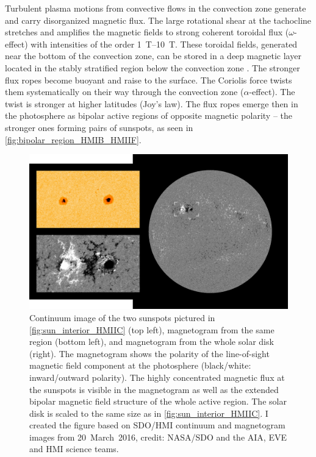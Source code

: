 Turbulent plasma motions from convective flows in the convection zone generate and carry disorganized magnetic flux. The large rotational shear at the tachocline stretches and amplifies the magnetic fields to strong coherent toroidal flux ($\omega$-effect) with intensities of the order \SIrange{1}{10}{\tesla}. These toroidal fields, generated near the bottom of the convection zone, can be stored in a deep magnetic layer located in the stably stratified region below the convection zone \citep{Ossendrijver2003}. The stronger flux ropes become buoyant and raise to the surface. The Coriolis force twists them systematically on their way through the convection zone ($\alpha$-effect). The twist is stronger at higher latitudes (Joy's law). The flux ropes emerge then in the photosphere as bipolar active regions of opposite magnetic polarity -- the stronger ones forming pairs of sunspots, as seen in \autoref{fig:bipolar_region_HMIB_HMIIF}.
\begin{figure}[htb]
	\centering
	\includegraphics[width=\textwidth]{figures_of_mine/schemata/bipolar_region_HMIB_HMIIF.png}
	\caption[I created the figure based on SDO/HMI continuum and magnetogram images from 20~March~2016, credit: NASA/SDO and the AIA, EVE and HMI science teams.]
	{Continuum image of the two sunspots pictured in \autoref{fig:sun_interior_HMIIC} (top left), magnetogram from the same region (bottom left), and magnetogram from the whole solar disk (right). The magnetogram shows the polarity of the line-of-sight magnetic field component at the photosphere (black/white: inward/outward polarity). The highly concentrated magnetic flux at the sunspots is visible in the magnetogram as well as the extended bipolar magnetic field structure of the whole active region. The solar disk is scaled to the same size as in \autoref{fig:sun_interior_HMIIC}. I created the figure based on SDO/HMI continuum and magnetogram images from 20~March~2016, credit: NASA/SDO and the AIA, EVE and HMI science teams.}
	\label{fig:bipolar_region_HMIB_HMIIF}
\end{figure}
